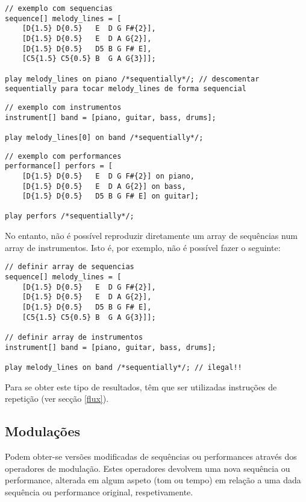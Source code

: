 \documentclass{article}
\begin{document}
\begin{lstlisting} 
// exemplo com sequencias
sequence[] melody_lines = [
    [D{1.5} D{0.5}   E  D G F#{2}], 
    [D{1.5} D{0.5}   E  D A G{2}],
    [D{1.5} D{0.5}   D5 B G F# E],
    [C5{1.5} C5{0.5} B  G A G{3}]];

play melody_lines on piano /*sequentially*/; // descomentar sequentially para tocar melody_lines de forma sequencial
\end{lstlisting}

\begin{lstlisting} 
// exemplo com instrumentos
instrument[] band = [piano, guitar, bass, drums];

play melody_lines[0] on band /*sequentially*/;
\end{lstlisting}

\begin{lstlisting} 
// exemplo com performances
performance[] perfors = [
    [D{1.5} D{0.5}   E  D G F#{2}] on piano, 
    [D{1.5} D{0.5}   E  D A G{2}] on bass,
    [D{1.5} D{0.5}   D5 B G F# E] on guitar];
    
play perfors /*sequentially*/;
\end{lstlisting}
No entanto, não é possível reproduzir diretamente um array de sequências num array de instrumentos. Isto é, por exemplo, não é possível fazer o seguinte:
\begin{lstlisting} 
// definir array de sequencias
sequence[] melody_lines = [
    [D{1.5} D{0.5}   E  D G F#{2}], 
    [D{1.5} D{0.5}   E  D A G{2}],
    [D{1.5} D{0.5}   D5 B G F# E],
    [C5{1.5} C5{0.5} B  G A G{3}]];

// definir array de instrumentos
instrument[] band = [piano, guitar, bass, drums];

play melody_lines on band /*sequentially*/; // ilegal!!
\end{lstlisting}
Para se obter este tipo de resultados, têm que ser utilizadas instruções de repetição (ver secção \ref{flux}).

\subsection{Modulações}
Podem obter-se versões modificadas de sequências ou performances através dos operadores de modulação. Estes operadores devolvem uma nova sequência ou performance, alterada em algum aspeto (tom ou tempo) em relação a uma dada sequência  ou performance original, respetivamente.
\end{document}
